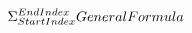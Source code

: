 \documentclass[preview]{standalone}
\begin{document}
\begin{align*}
\Sigma_{Start \space Index}^{End \space Index}{General \space Formula}
\end{align*}
\end{document}
